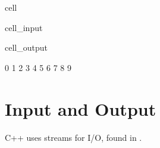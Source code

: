 \documentclass[a4paper,10pt,english]{jupyterBook}
\begin{document}
\begin{sphinxuseclass}{cell}\begin{sphinxVerbatimInput}

\begin{sphinxuseclass}{cell_input}
\begin{sphinxVerbatim}[commandchars=\\\{\}]
\PYG{p}{[}\PYG{p}{]}
\PYG{p}{[}\PYG{p}{]}
\end{sphinxVerbatim}

\end{sphinxuseclass}\end{sphinxVerbatimInput}
\begin{sphinxVerbatimOutput}

\begin{sphinxuseclass}{cell_output}
\begin{sphinxVerbatim}[commandchars=\\\{\}]
0 1 2 3 4 5 6 7 8 9 
\end{sphinxVerbatim}

\end{sphinxuseclass}\end{sphinxVerbatimOutput}

\end{sphinxuseclass}
\sphinxstepscope


\chapter{Input and Output}
\label{\detokenize{text/progtut/io:input-and-output}}\label{\detokenize{text/progtut/io::doc}}
\sphinxAtStartPar
C++ uses streams for I/O, found in .
\end{document}
